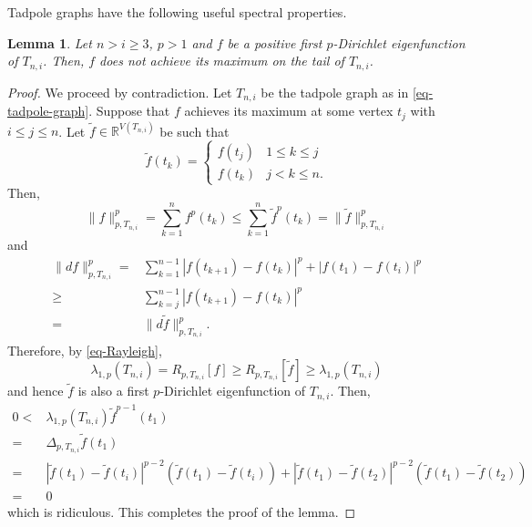 \documentclass[12pt]{amsart}
\def\R{\mathbb{R}}
\def\wt{\widetilde}
\newtheorem{lem}{Lemma}[section]
\theoremstyle{definition}
\theoremstyle{remark}
\numberwithin{equation}{section}
\begin{document}
Tadpole graphs have the following useful spectral properties.
\begin{lem}\label{lem-max-in-head}
 Let $n>i\geq 3$, $p>1$ and $f$ be a positive first $p$-Dirichlet eigenfunction of $T_{n,i}$. Then, $f$ does not achieve its maximum on the tail of $T_{n,i}$.
\end{lem}
\begin{proof}
We proceed by contradiction. Let $T_{n,i}$ be the tadpole graph as in \eqref{eq-tadpole-graph}. Suppose that $f$ achieves its maximum at some vertex $t_j$ with $i\leq j\leq n$. Let $\wt f\in \R^{V(T_{n,i})}$ be such that
$$\wt f(t_k)=\left\{\begin{array}{ll}f(t_j)& 1\leq k\leq j\\
f(t_k)&j<k\leq n.
\end{array}\right.$$
Then,
$$\|f\|_{p,T_{n,i}}^p=\sum_{k=1}^nf^p(t_k)\leq \sum_{k=1}^n\wt f^p(t_k)=\|\wt f\|_{p,T_{n,i}}^p$$
and
\begin{equation*}
\begin{split}
\|df\|_{p,T_{n,i}}^p=&\sum_{k=1}^{n-1}|f(t_{k+1})-f(t_{k})|^p+|f(t_1)-f(t_i)|^p\\
\geq&\sum_{k=j}^{n-1}|f(t_{k+1})-f(t_{k})|^p\\
=&\|d\wt f\|_{p,T_{n,i}}^p.
\end{split}
\end{equation*}
Therefore, by \eqref{eq-Rayleigh},
$$\lambda_{1,p}(T_{n,i})=R_{p,T_{n,i}}[f]\geq R_{p,T_{n,i}}[\wt f]\geq \lambda_{1,p}(T_{n,i})$$
and hence $\wt f$ is also a first $p$-Dirichlet eigenfunction of $T_{n,i}$. Then,
\begin{equation*}
\begin{split}
0<&\lambda_{1,p}(T_{n,i})\wt f^{p-1}(t_1)\\
=&\Delta_{p,T_{n,i}}\wt f(t_1)\\
=&|\wt f(t_1)-\wt f(t_i)|^{p-2}(\wt f(t_1)-\wt f(t_i))+|\wt f(t_1)-\wt f(t_2)|^{p-2}(\wt f(t_1)-\wt f(t_2))\\
=&0
\end{split}
\end{equation*}
which is ridiculous. This completes the proof of the lemma.
\end{proof}
\end{document}
